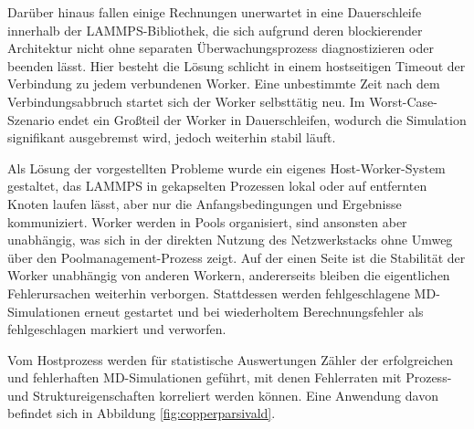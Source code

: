 Darüber hinaus fallen einige Rechnungen unerwartet in eine Dauerschleife innerhalb der LAMMPS-Bibliothek, die sich aufgrund deren blockierender Architektur nicht ohne separaten Überwachungsprozess diagnostizieren oder beenden lässt.
Hier besteht die Lösung schlicht in einem hostseitigen Timeout der Verbindung zu jedem verbundenen Worker.
Eine unbestimmte Zeit nach dem Verbindungsabbruch startet sich der Worker selbsttätig neu.
Im Worst-Case-Szenario endet ein Großteil der Worker in Dauerschleifen, wodurch die Simulation signifikant ausgebremst wird, jedoch weiterhin stabil läuft.

Als Lösung der vorgestellten Probleme wurde ein eigenes Host-Worker-System gestaltet, das LAMMPS in gekapselten Prozessen lokal oder auf entfernten Knoten laufen lässt, aber nur die Anfangsbedingungen und Ergebnisse kommuniziert.
Worker werden in Pools organisiert, sind ansonsten aber unabhängig, was sich in der direkten Nutzung des Netzwerkstacks ohne Umweg über den Poolmanagement-Prozess zeigt.
Auf der einen Seite ist die Stabilität der Worker unabhängig von anderen Workern, andererseits bleiben die eigentlichen Fehlerursachen weiterhin verborgen.
Stattdessen werden fehlgeschlagene MD-Simulationen erneut gestartet und bei wiederholtem Berechnungsfehler als fehlgeschlagen markiert und verworfen.

Vom Hostprozess werden für statistische Auswertungen Zähler der erfolgreichen und fehlerhaften MD-Simulationen geführt, mit denen Fehlerraten mit Prozess- und Struktureigenschaften korreliert werden können.
Eine Anwendung davon befindet sich in Abbildung \ref{fig:copperparsivald}.
